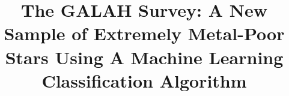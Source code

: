 \documentclass[]{aastex631}
\begin{document}
\title{The GALAH Survey: A New Sample of Extremely Metal-Poor Stars Using A Machine Learning Classification Algorithm}


\end{document}
